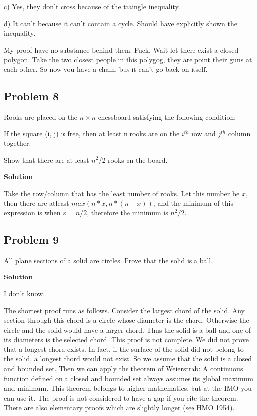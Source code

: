\documentclass{article}
\begin{document}
c) Yes, they don't cross because of the traingle inequality.

d) It can't because it can't contain a cycle. Should have explicitly shown the inequality.


My proof have no substance behind them. Fuck. Wait let there exist a closed polygon. Take the two closest people in this polygog, they are point their guns at each other. 
So now you have a chain, but it can't go back on itself. 

\subsection{Problem 8}

Rooks are placed on the $n \times n$ chessboard satisfying the following condition:

If the square (i, j) is free, then at least n rooks are on the $i^{th}$ row and $j^{th}$ column together.

Show that there are at least $n^2$/2 rooks on the board. 

\textbf{Solution}

Take the row/column that has the least number of rooks. Let this number be $x$, then there are atleast $max(n*x,n*(n-x))$, and the 
minimum of this expression is when $x=n/2$, therefore the minimum is $n^2/2$.

\subsection{Problem 9}

All plane sections of a solid are circles. Prove that the solid is a ball.


\textbf{Solution}

I don't know.

The shortest proof runs as follows. Consider the largest chord of the solid. Any
section through this chord is a circle whose diameter is the chord. Otherwise the
circle and the solid would have a larger chord. Thus the solid is a ball and one of its
diameters is the selected chord.
This proof is not complete. We did not prove that a longest chord exists. In fact, if
the surface of the solid did not belong to the solid, a longest chord would not exist.
So we assume that the solid is a closed and bounded set. Then we can apply the
theorem of Weierstrab: A continuous function defined on a closed and bounded set
always assumes its global maximum and minimum.
This theorem belongs to higher mathematics, but at the IMO you can use it. The proof
is not considered to have a gap if you cite the theorem. There are also elementary
proofs which are slightly longer (see HMO 1954).
\end{document}
